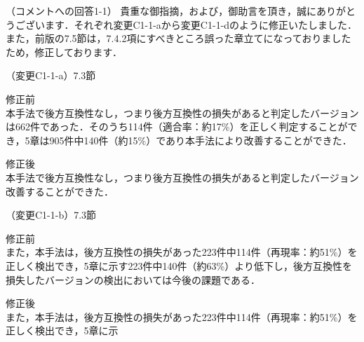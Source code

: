 \documentclass{jarticle} %
\def\subsection#1{ \vspace{1pc} {\gt #1} }
\begin{document}
\subsection{（コメントへの回答1-1）}
貴重な御指摘，および，御助言を頂き，誠にありがとうございます．それぞれ変更C1-1-aから変更C1-1-dのように修正いたしました．また，前版の7.5節は，7.4.2項にすべきところ誤った章立てになっておりましたため，修正しております．

\subsection{（変更C1-1-a）7.3節}
\vspace{-0.3cm}
\begin{description}
\item 修正前\\
\phantom{　}
本手法で後方互換性なし，つまり後方互換性の損失があると判定したバージョンは662件であった．そのうち114件（適合率：約17\%）を正しく判定することができ，5章は905件中140件（約15\%）であり本手法により改善することができた．
\vspace{-0.3cm}
\item 修正後\\
\phantom{　}
本手法で後方互換性なし，つまり後方互換性の損失があると判定したバージョン\textcolor{red}{}改善することができた．
\end{description}

\subsection{（変更C1-1-b）7.3節}
\vspace{-0.3cm}
\begin{description}
\item 修正前\\
\phantom{　}
また，本手法は，後方互換性の損失があった223件中114件（再現率：約51\%）を正しく検出でき，5章に示す223件中140件（約63\%）より低下し，後方互換性を損失したバージョンの検出においては今後の課題である．
\vspace{-0.3cm}
\item 修正後\\
\phantom{　}
また，本手法は，後方互換性の損失があった223件中114件（再現率：約51\%）を正しく検出でき，5章に示\textcolor{red}{}
\end{description}
\end{document}
